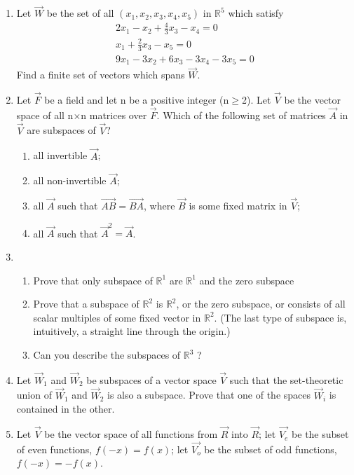 \begin{enumerate}[label=\thesubsection.\arabic*.,ref=\thesubsection.\theenumi]
%
\\
\solution

%
\item  Let $\vec{W}$ be the set of all $(x_1,x_2,x_3,x_4,x_5)$ in $\mathbb{R}^5$ which satisfy
 \begin{align}
 2x_1-x_2+\frac{4}{3}x_3-x_4=0\\x_1+\frac{2}{3}x_3-x_5=0\\9x_1-3x_2+6x_3-3x_4-3x_5=0
 \end{align}
 Find a finite set of vectors which spans $\vec{W}$.

\solution

\item Let $\vec{F}$ be a field and let n be a positive integer (n$\geq$2). Let $\vec{V}$ be the vector space of all n$\times$n matrices over $\vec{F}$. Which of the following set of matrices $\vec{A}$ in $\vec{V}$ are subspaces of   $\vec{V}$?
\begin{enumerate}
\item all invertible $\vec{A}$;
\item all non-invertible $\vec{A}$;
\item all $\vec{A}$ such that $\vec{AB}=\vec{BA}$, where $\vec{B}$ is some fixed matrix in $\vec{V}$;
\item all $\vec{A}$ such that $\vec{A}^2 = \vec{A}$.
\end{enumerate}
%
\solution

%
\item 
\begin{enumerate}[label=\alph*.]
    \item Prove that only subspace of $\mathbb{R}^1$ are $\mathbb{R}^1$ and the zero subspace 
    \item Prove that a subspace of $\mathbb{R}^2$ is $\mathbb{R}^2$, or the zero subspace, or consists of all scalar multiples of some fixed vector in $\mathbb{R}^2$. (The last type of subspace is, intuitively,
a straight line through the origin.)
	\item Can you describe the subspaces of $\mathbb{R}^3$ ?
\end{enumerate}
%
\solution

%
\item Let $\vec{W}_1$ and $\vec{W}_2$ be subspaces of a vector space $\vec{V}$ such that the set-theoretic union of $\vec{W}_1$ and $\vec{W}_2$ is also a subspace. Prove that one of the spaces $\vec{W}_i$ is contained in the other.
%
\solution

\item Let $\vec{V}$ be the  vector space of all functions from $\vec{R}$ into $\vec{R}$; let $\vec{V_e}$ be the subset of even functions, $f(-x) = f(x)$; let $\vec{V_o}$ be the subset of odd functions, $f(-x) = -f(x)$.

\end{enumerate}
